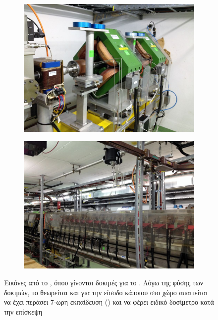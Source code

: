 \begin{figure}[tph]
\begin{subfigure}{0.47\linewidth}
		\includegraphics[width=\linewidth]{images/CLIC-CTF3-img3}
    \end{subfigure}        
	\hfill
    \begin{subfigure}{0.47\linewidth}
		\centering
		\includegraphics[width=\linewidth]{images/CLIC-CTF3-img4}
    \end{subfigure}
\caption[Εικόνες από το ]
{Εικόνες από το , όπου γίνονται δοκιμές για το . 
Λόγω της φύσης των δοκιμών, το  θεωρείται  και για την είσοδο κάποιου στο χώρο απαιτείται να έχει περάσει 7-ωρη εκπαίδευση () και να φέρει ειδικό δοσίμετρο κατά την επίσκεψη}
\label{img:CLIC-CTF3}        
\end{figure}



